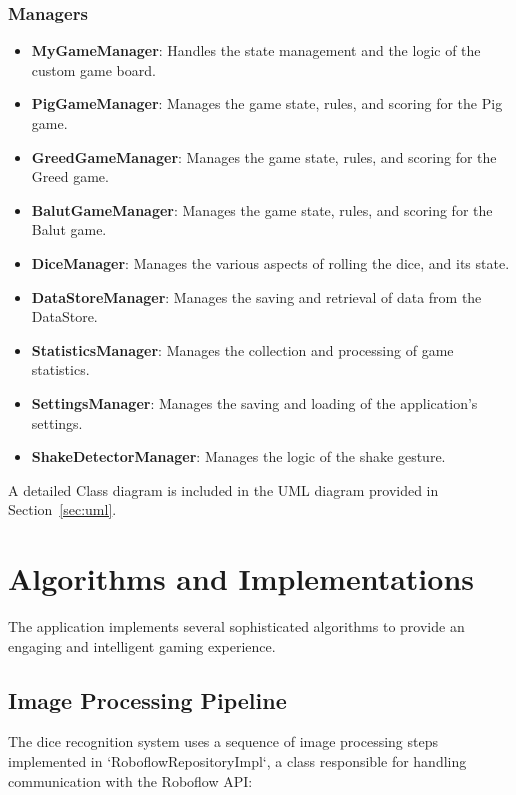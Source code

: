 \subsubsection{Managers}
\begin{itemize}
    \item \textbf{MyGameManager}: Handles the state management and the logic of the custom game board.
    \item \textbf{PigGameManager}: Manages the game state, rules, and scoring for the Pig game.
    \item \textbf{GreedGameManager}: Manages the game state, rules, and scoring for the Greed game.
    \item \textbf{BalutGameManager}: Manages the game state, rules, and scoring for the Balut game.
    \item \textbf{DiceManager}: Manages the various aspects of rolling the dice, and its state.
    \item \textbf{DataStoreManager}: Manages the saving and retrieval of data from the DataStore.
    \item \textbf{StatisticsManager}: Manages the collection and processing of game statistics.
    \item \textbf{SettingsManager}: Manages the saving and loading of the application's settings.
    \item \textbf{ShakeDetectorManager}: Manages the logic of the shake gesture.
\end{itemize}

\vspace{0.2cm}
A detailed Class diagram is included in the UML diagram provided in Section~\ref{sec:uml}.

\section{Algorithms and Implementations}

The application implements several sophisticated algorithms to provide an engaging and intelligent gaming experience. 

\subsection{Image Processing Pipeline}

The dice recognition system uses a sequence of image processing steps implemented in `RoboflowRepositoryImpl`, a class responsible for handling communication with the Roboflow API:

